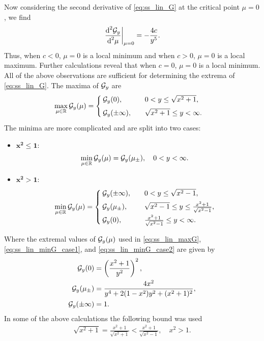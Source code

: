 \documentclass[a4paper,10pt]{article}
\begin{document}
%
Now considering the second derivative of \eqref{eq:ss_lin_G} at the critical point $\mu = 0$, we find
\begin{align*}
\left. \frac{\textrm{d}^2 {\cal G}_y}{\textrm{d}^2 \mu} \right|_{\mu = 0} = - \frac{4c}{y^5}.
\end{align*}
Thus, when $c < 0$, $\mu  =  0$ is a local minimum and when $c > 0$, $\mu = 0$ is a local maximum. Further calculations reveal that when $c = 0$, $\mu = 0$ is a local minimum.\\


All of the above observations are sufficient for determining the extrema of \eqref{eq:ss_lin_G}. The maxima of ${\cal G}_y$ are
\begin{align}
\label{eq:ss_lin_maxG}
\underset{\mu \in \mathbb{R}}{\max} \, {\cal G}_y(\mu) &= 
\begin{cases}
{\cal G}_y(0), \quad &0 <  y \leq \sqrt{x^2 + 1},\\[1ex]
{\cal G}_y(\pm \infty), \quad &\sqrt{x^2 + 1} \leq  y < \infty.
\end{cases}
\end{align}
The minima are more complicated and are split into two cases:
\begin{itemize}
\setlength{\itemsep}{2ex}
\item \underline{$\bm{x^2\leq1}:$}
\begin{align}
\label{eq:ss_lin_minG_case1}
\underset{\mu \in \mathbb{R}}{\min} \, {\cal G}_y(\mu) &= {\cal G}_y(\mu_{\pm}), \quad 0 <  y < \infty.
\end{align}

\item \underline{$\bm{x^2>1}:$}
\begin{align}
\label{eq:ss_lin_minG_case2}
\underset{\mu \in \mathbb{R}}{\min} \, {\cal G}_y(\mu) &= 
\begin{cases}
{\cal G}_y(\pm \infty), \quad &0 <  y \leq \sqrt{x^2 - 1},\\[1ex]
{\cal G}_y(\mu_{\pm}), \quad & \sqrt{x^2 - 1} \leq  y \leq \frac{x^2+1}{\sqrt{x^2 - 1}}, \\[1ex]
{\cal G}_y(0), \quad & \frac{x^2+1}{\sqrt{x^2 - 1}} \leq  y < \infty.
\end{cases}
\end{align}
\end{itemize}
Where the extremal values of ${\cal G}_y(\mu)$ used in \eqref{eq:ss_lin_maxG}, \eqref{eq:ss_lin_minG_case1}, and \eqref{eq:ss_lin_minG_case2} are given by
\begin{align*}
{\cal G}_y(0) &= \left(\frac{x^2 + 1}{y^2}\right)^2, \\
{\cal G}_y(\mu_{\pm}) &= \frac{4x^2}{y^4 + 2(1-x^2)y^2 + (x^2 + 1)^2}, \\
{\cal G}_y(\pm \infty) &= 1.
\end{align*}
In some of the above calculations the following bound was used
\begin{align*}
\sqrt{x^2+1} = \frac{x^2+1}{\sqrt{x^2+1}} < \frac{x^2+1}{\sqrt{x^2-1}}, \quad x^2 > 1.
\end{align*}
\end{document}
